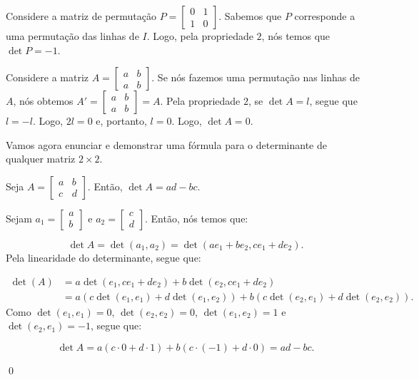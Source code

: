 \begin{Example}
	Considere a matriz de permutação $P = \begin{bmatrix}
		0 & 1 \\
		1 & 0
	\end{bmatrix}$. Sabemos que $P$ corresponde a uma permutação das linhas de $I$. Logo, pela propriedade $2$, nós temos que $\det P = -1$.
\end{Example}

\begin{Example}
	Considere a matriz $A = \begin{bmatrix}
		a & b \\
		a & b
	\end{bmatrix}$. Se nós fazemos uma permutação nas linhas de $A$, nós obtemos $A' = \begin{bmatrix}
		a & b \\
		a & b
	\end{bmatrix} = A$. Pela propriedade $2$, se $\det A = l$, segue que $l = -l$. Logo, $2l = 0$ e, portanto, $l = 0$. Logo, $\det A = 0$.
\end{Example}

Vamos agora enunciar e demonstrar uma fórmula para o determinante de qualquer matriz $2\times 2$.

\begin{Proposition}
	Seja $A = \begin{bmatrix}
		a & b \\
		c & d
	\end{bmatrix}$. Então, $\det A = ad - bc$.
\end{Proposition}

\begin{Proof}
	Sejam $a_1 = \begin{bmatrix}
		a \\
		b
	\end{bmatrix}$ e $a_2 = \begin{bmatrix}
		c \\
		d
	\end{bmatrix}$. Então, nós temos que:
	
	$$
	\det A = \det(a_1, a_2) = \det(ae_1 + be_2, ce_1 + de_2).
	$$
	Pela linearidade do determinante, segue que:
	
	\begin{align*}
		\det (A) &= a\det(e_1, ce_1 + de_2) + b\det(e_2, ce_1 + de_2) \\ &= a(c\det(e_1, e_1) + d\det(e_1, e_2)) + b(c\det(e_2, e_1) + d\det(e_2, e_2)).
	\end{align*}
	Como $\det(e_1, e_1) = 0$, $\det(e_2, e_2) = 0$, $\det(e_1, e_2) = 1$ e $\det(e_2, e_1) = -1$, segue que:
	
	$$
	\det A = a(c\cdot 0 + d\cdot 1) + b(c\cdot(-1) + d\cdot 0) = ad - bc.
	$$
	
	\qed
\end{Proof}

